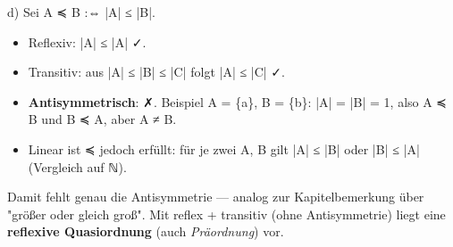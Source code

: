 \documentclass[11pt, a4paper]{article}
\begin{document}
d) Sei A ≼ B :⇔ |A| ≤ |B|.

\begin{itemize}
  \item Reflexiv: |A| ≤ |A| ✓.
  \item Transitiv: aus |A| ≤ |B| ≤ |C| folgt |A| ≤ |C| ✓.
  \item \textbf{Antisymmetrisch}: ✗. Beispiel A = \{a\}, B = \{b\}: |A| = |B| = 1, also A ≼ B und B ≼ A, aber A ≠ B.
  \item Linear ist ≼ jedoch erfüllt: für je zwei A, B gilt |A| ≤ |B| oder |B| ≤ |A| (Vergleich auf ℕ).
\end{itemize}

Damit fehlt genau die Antisymmetrie — analog zur Kapitelbemerkung über "größer oder gleich groß". Mit reflex + transitiv (ohne Antisymmetrie) liegt eine \textbf{reflexive Quasiordnung} (auch \textit{Präordnung}) vor.





\end{document}
